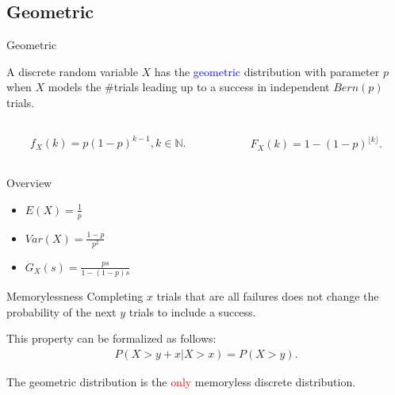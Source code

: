 \documentclass{beamer}
\def\padding{\vspace{0.5cm}}
\def\b{\textcolor{blue}}
\def\r{\textcolor{red}}
\begin{document}
\subsection{Geometric}
\begin{frame}{Geometric}
    \begin{definition}
        A discrete random variable $X$ has the \b{geometric} distribution with parameter $p$ when $X$ models the \#trials leading up to a success in independent $Bern(p)$ trials.
    \end{definition}\pause
    \begin{columns}
        \begin{column}{0.5\textwidth}
           \begin{align*}
                f_X(k) = p (1 - p)^{k - 1}, k \in \mathbb{N}.
            \end{align*}
        \end{column}\pause
        \begin{column}{0.5\textwidth}
            \begin{align*}
                F_X(k) = 1 - (1 - p)^{\lfloor k \rfloor}.
            \end{align*}
        \end{column}
    \end{columns}\pause\par\padding
    \begin{exampleblock}{Overview}
        \begin{itemize}
            \item $E(X) = \frac{1}{p}$\pause
            \item $Var(X) = \frac{1 - p}{p^2}$\pause
            \item $G_X(s) = \frac{p s}{1 - (1 - p) s}$
        \end{itemize}
    \end{exampleblock}
\end{frame}

\begin{frame}
    \begin{block}{Memorylessness}
        Completing $x$ trials that are all failures does not change the probability of the next $y$ trials to include a success.\pause\par\padding
        This property can be formalized as follows:
        \begin{align*}
            P(X > y + x | X > x) = P(X > y).
        \end{align*}\pause\par\padding
        The geometric distribution is the \r{only} memoryless discrete distribution.
    \end{block}
\end{frame}
\end{document}
